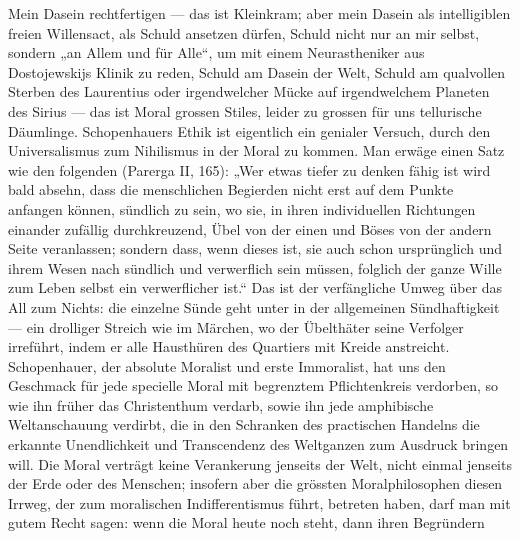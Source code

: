 Mein Dasein  rechtfertigen — das ist Kleinkram; aber mein Dasein als intelligiblen freien Willensact, als Schuld ansetzen dürfen, Schuld nicht nur an mir selbst, sondern „an Allem und für Alle“, um mit einem Neurastheniker aus Dostojewskijs Klinik zu reden, Schuld am Dasein der Welt, Schuld am qualvollen Sterben des Laurentius oder irgendwelcher Mücke auf irgendwelchem Planeten des Sirius — das ist Moral grossen Stiles, leider zu grossen für uns tellurische Däumlinge. Schopenhauers Ethik ist eigentlich ein genialer Versuch, durch den Universalismus zum Nihilismus in der Moral zu kommen. Man erwäge einen Satz wie den folgenden (Parerga II, 165): „Wer etwas tiefer zu denken fähig ist wird bald absehn, dass die menschlichen Begierden nicht erst auf dem Punkte anfangen können, sündlich zu sein, wo sie, in ihren individuellen Richtungen einander zufällig durchkreuzend, Übel von der einen und Böses von der andern Seite veranlassen; sondern dass, wenn dieses ist, sie auch schon ursprünglich und ihrem Wesen nach sündlich und verwerflich sein müssen, folglich der ganze Wille zum Leben selbst ein verwerflicher ist.“ Das ist der verfängliche Umweg über das All zum Nichts: die einzelne Sünde geht unter in der allgemeinen Sündhaftigkeit — ein drolliger Streich wie im Märchen, wo der Übelthäter seine Verfolger irreführt, indem er alle Hausthüren des Quartiers mit Kreide anstreicht. Schopenhauer, der absolute Moralist und erste Immoralist, hat uns den Geschmack für jede specielle Moral mit begrenztem Pflichtenkreis verdorben, so wie ihn früher das Christenthum verdarb, sowie ihn jede amphibische Weltanschauung verdirbt, die in den Schranken des practischen Handelns die erkannte Unendlichkeit und Transcendenz des Weltganzen zum Ausdruck bringen will. Die Moral verträgt keine Verankerung jenseits der Welt, nicht einmal jenseits der Erde oder des Menschen; insofern aber die grössten Moralphilosophen diesen Irrweg, der zum moralischen Indifferentismus führt, betreten haben, darf man mit gutem Recht sagen: wenn die Moral heute noch steht, dann ihren Begründern\Sperr{!}
\par

